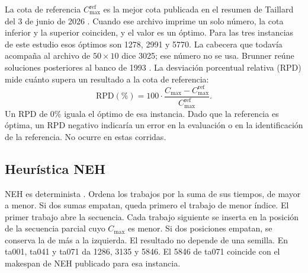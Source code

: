 \documentclass[journal]{IEEEtran}
\begin{document}
La cota de referencia $C_{\max}^{\mathrm{ref}}$ es la mejor cota publicada en el resumen de Taillard del 3 de junio de 2026 \cite{taillard_bounds_2026}. Cuando ese archivo imprime un solo número, la cota inferior y la superior coinciden, y el valor es un óptimo. Para las tres instancias de este estudio esos óptimos son 1278, 2991 y 5770. La cabecera que todavía acompaña al archivo de $50\times10$ dice 3025; ese número no se usa. Brunner reúne soluciones posteriores al banco de 1993 \cite{brunner_permutation_2025,taillard_benchmarks_1993}. La desviación porcentual relativa (RPD) mide cuánto supera un resultado a la cota de referencia:
\begin{equation}
  \mathrm{RPD}(\%)=100\cdot\frac{C_{\max}-C_{\max}^{\mathrm{ref}}}{C_{\max}^{\mathrm{ref}}}.\label{eq:rpd}
\end{equation}
Un RPD de 0\% iguala el óptimo de esa instancia. Dado que la referencia es óptima, un RPD negativo indicaría un error en la evaluación o en la identificación de la referencia. No ocurre en estas corridas.

\subsection{Heurística NEH}
NEH es determinista \cite{nawaz_heuristic_1983}. Ordena los trabajos por la suma de sus tiempos, de mayor a menor. Si dos sumas empatan, queda primero el trabajo de menor índice. El primer trabajo abre la secuencia. Cada trabajo siguiente se inserta en la posición de la secuencia parcial cuyo $C_{\max}$ es menor. Si dos posiciones empatan, se conserva la de más a la izquierda. El resultado no depende de una semilla. En ta001, ta041 y ta071 da 1286, 3135 y 5846. El 5846 de ta071 coincide con el makespan de NEH publicado para esa instancia.
\end{document}
